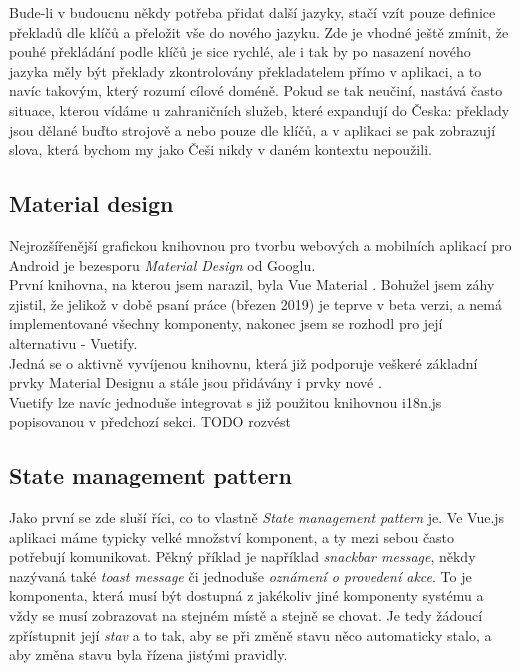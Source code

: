 Bude-li v budoucnu někdy potřeba přidat další jazyky, stačí vzít pouze definice překladů dle klíčů a přeložit vše do nového jazyku. Zde je vhodné ještě zmínit, že pouhé překládání podle klíčů je sice rychlé, ale i tak by po nasazení nového jazyka měly být překlady zkontrolovány překladatelem přímo v aplikaci, a to navíc takovým, který rozumí cílové doméně. Pokud se tak neučiní, nastává často situace, kterou vídáme u zahraničních služeb, které expandují do Česka: překlady jsou dělané buďto strojově a nebo pouze dle klíčů, a v aplikaci se pak zobrazují slova, která bychom my jako Češi nikdy v daném kontextu nepoužili.


\subsection{Material design}

Nejrozšířenější grafickou knihovnou pro tvorbu webových a mobilních aplikací pro Android je bezesporu \emph{Material Design} od Googlu.\\
První knihovna, na kterou jsem narazil, byla Vue Material \cite{vue-material}. Bohužel jsem záhy zjistil, že jelikož v době psaní práce (březen 2019) je teprve v beta verzi, a nemá implementované všechny komponenty, nakonec jsem se rozhodl pro její alternativu - Vuetify.\\
Jedná se o aktivně vyvíjenou knihovnu, která již podporuje veškeré základní prvky Material Designu a stále jsou přidávány i prvky nové \cite{vuetify}.\\
Vuetify lze navíc jednoduše integrovat s již použitou knihovnou i18n.js popisovanou v předchozí sekci.
TODO rozvést


\subsection{State management pattern}

Jako první se zde sluší říci, co to vlastně \emph{State management pattern} je. Ve Vue.js aplikaci máme typicky velké množství komponent, a ty mezi sebou často potřebují komunikovat. Pěkný příklad je například \emph{snackbar message}, někdy nazývaná také \emph{toast message} či jednoduše \emph{oznámení o provedení akce}. To je komponenta, která musí být dostupná z jakékoliv jiné komponenty systému a vždy se musí zobrazovat na stejném místě a stejně se chovat. Je tedy žádoucí zpřístupnit její \emph{stav} a to tak, aby se při změně stavu něco automaticky stalo, a aby změna stavu byla řízena jistými pravidly.


